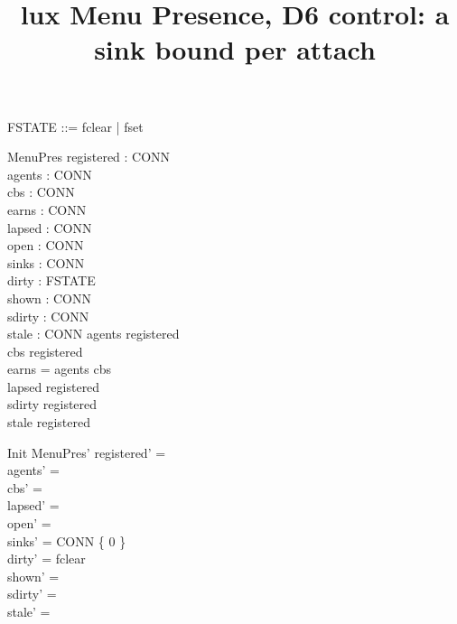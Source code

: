 \documentclass[a4paper,10pt,fleqn]{article}
\begin{document}
\title{lux Menu Presence, D6 control: a sink bound per attach}
\maketitle

\begin{zed}
  [CONN]
\end{zed}

\begin{zed}
  FSTATE ::= fclear | fset
\end{zed}

\begin{schema}{MenuPres}
  registered : \power CONN \\
  agents : \power CONN \\
  cbs : \power CONN \\
  earns : \power CONN \\
  lapsed : \power CONN \\
  open : \power CONN \\
  sinks : CONN   \\
  dirty : FSTATE \\
  shown : \power CONN \\
  sdirty : \power CONN \\
  stale : \power CONN
\where
  agents \subseteq registered \\
  cbs \subseteq registered \\
  earns = agents \cup cbs \\
  lapsed \subseteq registered \\
  sdirty \subseteq registered \\
  stale \subseteq registered
\end{schema}

\begin{schema}{Init}
  MenuPres'
\where
  registered' = \emptyset \\
  agents' = \emptyset \\
  cbs' = \emptyset \\
  lapsed' = \emptyset \\
  open' = \emptyset \\
  sinks' = CONN \cross \{ 0 \} \\
  dirty' = fclear \\
  shown' = \emptyset \\
  sdirty' = \emptyset \\
  stale' = \emptyset
\end{schema}
\end{document}

